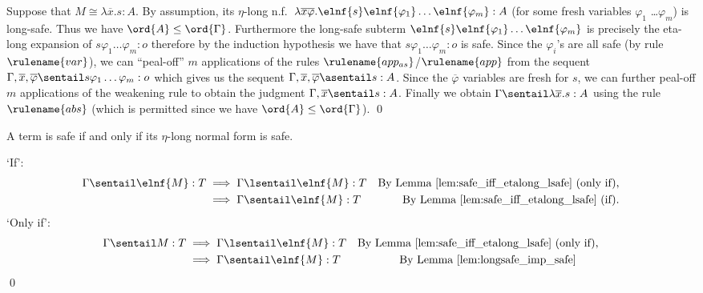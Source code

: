 Suppose that $M \cong \lambda \overline{x} . s : A$. By assumption,
its  $\eta$-long n.f.\ $\lambda \overline{x} \overline{\varphi} .
\elnf{s} \elnf{\varphi_1} \ldots \elnf{\varphi_m}: A$ (for some
fresh variables $\varphi_1$ \ldots $\varphi_m$) is long-safe. Thus
we have $\ord{A}\leq\ord{\Gamma}$. Furthermore the long-safe subterm
$\elnf{s} \elnf{\varphi_1} \ldots \elnf{\varphi_m}$ is precisely the
eta-long expansion of $s\varphi_1 \ldots \varphi_m : o$ therefore by
the induction hypothesis we have that $s \varphi_1 \ldots \varphi_m
:o$ is safe. Since the $\varphi_i$'s are all safe (by rule
$\rulename{var}$), we can ``peal-off'' $m$ applications of the rules
$\rulename{app_{as}}$/$\rulename{app}$ from the sequent $\Gamma,
\overline{x}, \overline{\varphi} \sentail s \varphi_1 \ldots
\varphi_m :o$ which gives us the sequent $\Gamma, \overline{x},
\overline{\varphi} \asentail s : A$. Since the $\overline{\varphi}$
variables are fresh for $s$, we can further peal-off $m$
applications of the weakening rule to obtain the judgment $\Gamma,
\overline{x} \sentail s : A$. Finally we obtain $\Gamma \sentail
\lambda \overline{x} . s : A$ using the rule $\rulename{abs}$ (which
is permitted since we have $\ord{A}\leq\ord{\Gamma}$). \qed
\smallskip






\begin{proposition}
\label{prop:safe_iff_elnfsafe}
A term is safe if and only if its $\eta$-long normal form is safe.
\end{proposition}
\proof
`If':
\begin{align*}
  \Gamma \sentail \elnf{M}:T &\implies   \Gamma \lsentail \elnf{M}:T &  \mbox{By Lemma \ref{lem:safe_iff_etalong_lsafe} (only if),} \\
  &\implies   \Gamma \sentail \elnf{M}:T &  \mbox{By Lemma \ref{lem:safe_iff_etalong_lsafe} (if).}
\end{align*}
`Only if':
\begin{align*}
  \Gamma \sentail M:T &\implies   \Gamma \lsentail \elnf{M}:T &  \mbox{By Lemma \ref{lem:safe_iff_etalong_lsafe} (only if),} \\
  &\implies \Gamma \sentail \elnf{M}:T &  \mbox{By Lemma \ref{lem:longsafe_imp_safe}\qquad }
\end{align*}
\qed


